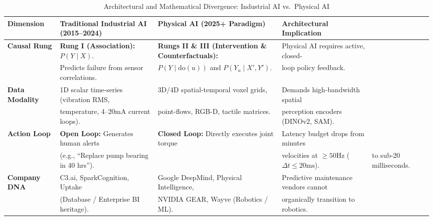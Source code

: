 \documentclass[11pt,a4paper]{article}
\begin{document}
\begin{table}[h!]
\centering
\scriptsize
\begin{tabularx}{\textwidth}{@{}l p{4.5cm} p{5.5cm} X@{}}
\toprule
\textbf{Dimension} & \textbf{Traditional Industrial AI (2015--2024)} & \textbf{Physical AI (2025+ Paradigm)} & \textbf{Architectural Implication} \\
\midrule
\textbf{Causal Rung} & \textbf{Rung I (Association):} $P(Y \mid X)$. & \textbf{Rungs II \& III (Intervention \& Counterfactuals):} & Physical AI requires active, closed- \\
& Predicts failure from sensor correlations. & $P(Y \mid \text{do}(u))$ and $P(Y_u \mid X', Y')$. & loop policy feedback. \\
\addlinespace
\textbf{Data Modality} & 1D scalar time-series (vibration RMS, & 3D/4D spatial-temporal voxel grids, & Demands high-bandwidth spatial \\
& temperature, 4--20mA current loops). & point-flows, RGB-D, tactile matrices. & perception encoders (DINOv2, SAM). \\
\addlinespace
\textbf{Action Loop} & \textbf{Open Loop:} Generates human alerts & \textbf{Closed Loop:} Directly executes joint torque & Latency budget drops from minutes \\
& (e.g., ``Replace pump bearing in 40 hrs''). & & velocities at $\ge 50\text{Hz}$ ($\Delta t \le 20\text{ms}$). & to sub-20 milliseconds. \\
\addlinespace
\textbf{Company DNA} & C3.ai, SparkCognition, Uptake & Google DeepMind, Physical Intelligence, & Predictive maintenance vendors cannot \\
& (Database / Enterprise BI heritage). & NVIDIA GEAR, Wayve (Robotics / ML). & organically transition to robotics. \\
\bottomrule
\end{tabularx}
\caption{Architectural and Mathematical Divergence: Industrial AI vs.\ Physical AI}
\end{table}
\end{document}
